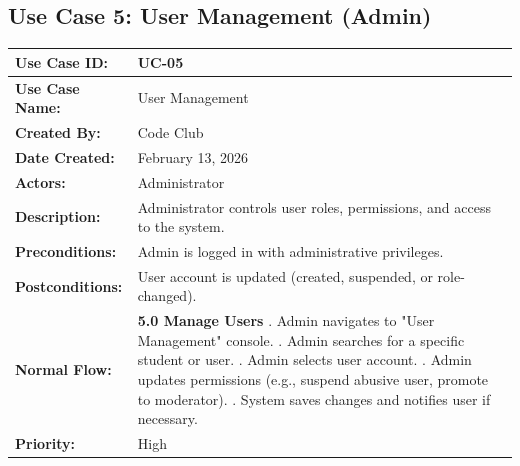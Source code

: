 \documentclass[12pt,a4paper]{article}
\begin{document}
\subsection*{Use Case 5: User Management (Admin)}
\begin{longtable}{|p{4cm}|p{11cm}|}
\hline
\textbf{Use Case ID:} & UC-05 \\
\hline
\textbf{Use Case Name:} & User Management \\
\hline
\textbf{Created By:} & Code Club \\
\textbf{Date Created:} &February 13, 2026 \\
\hline
\textbf{Actors:} & Administrator \\
\hline
 \textbf{Description:} & Administrator controls user roles, permissions, and access to the system. \\
\hline
\textbf{Preconditions:} & Admin is logged in with administrative privileges. \\
\hline
\textbf{Postconditions:} & User account is updated (created, suspended, or role-changed). \\
\hline
\textbf{Normal Flow:} & 
\textbf{5.0 Manage Users} \newline
1. Admin navigates to "User Management" console. \newline
2. Admin searches for a specific student or user. \newline
3. Admin selects user account. \newline
4. Admin updates permissions (e.g., suspend abusive user, promote to moderator). \newline
5. System saves changes and notifies user if necessary. \\
\hline
 \textbf{Priority:} & High \\
\hline
\end{longtable}
\newpage

\end{document}
